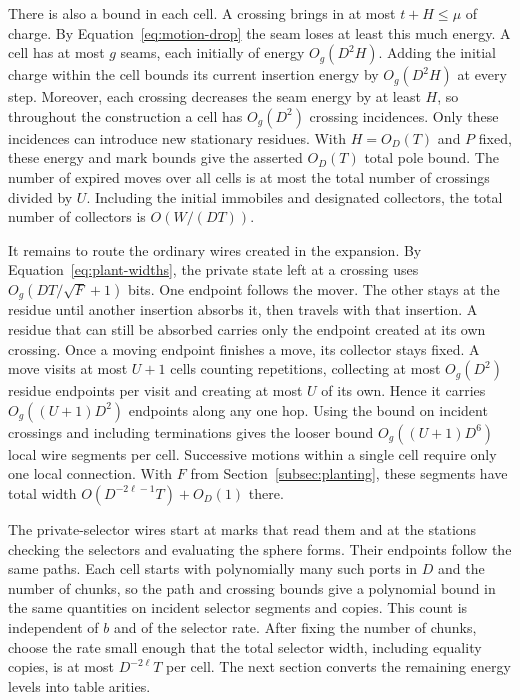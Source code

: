 There is also a bound in each cell. A crossing brings in at most
$t+H\le\mu$ of charge. By Equation~\eqref{eq:motion-drop} the seam loses
at least this much energy. A cell has at most $g$ seams, each initially
of energy $O_g(D^2H)$. Adding the initial charge within the cell bounds
its current insertion energy by $O_g(D^2H)$ at every step. Moreover,
each crossing decreases the seam energy by at least $H$, so throughout
the construction a cell has $O_g(D^2)$ crossing incidences. Only these
incidences can introduce new stationary residues. With $H=O_D(T)$ and
$P$ fixed, these energy and mark bounds give the asserted $O_D(T)$ total
pole bound. The number of expired moves over all cells is at most the
total number of crossings divided by $U$. Including the initial immobiles
and designated collectors, the total number of collectors is $O(W/(DT))$.

It remains to route the ordinary wires created in the expansion. By
Equation~\eqref{eq:plant-widths}, the private state left at a crossing
uses $O_g(DT/\sqrt F+1)$ bits. One endpoint follows the mover. The
other stays at the residue until another insertion absorbs it, then
travels with that insertion. A residue that can still be absorbed
carries only the endpoint created at its own crossing. Once a moving
endpoint finishes a move, its collector stays fixed. A move visits at
most $U+1$ cells counting repetitions, collecting at most $O_g(D^2)$
residue endpoints per visit and creating at most $U$ of its own.
Hence it carries $O_g((U+1)D^2)$ endpoints along any one hop. Using
the bound on incident crossings and including terminations gives the
looser bound $O_g((U+1)D^6)$ local wire segments per cell. Successive
motions within a single cell require only one local connection. With
$F$ from Section~\ref{subsec:planting}, these segments have total width
$O(D^{-2\ell-1}T)+O_D(1)$ there.

The private-selector wires start at marks that read them and at the
stations checking the selectors and evaluating the sphere forms. Their
endpoints follow the same paths. Each cell starts with polynomially
many such ports in $D$ and the number of chunks, so the path and
crossing bounds give a polynomial bound in the same quantities on
incident selector segments and copies. This count is independent of
$b$ and of the selector rate. After fixing the number of chunks, choose
the rate small enough that the total selector width, including equality
copies, is at most $D^{-2\ell}T$ per cell. The next section converts the
remaining energy levels into table arities.
